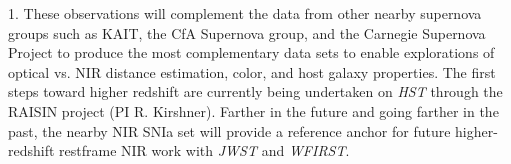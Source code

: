\documentclass[11pt]{article}
\begin{document}
% 



% 
% 
%

\otherfacilities

1. These observations will complement the data from other nearby supernova groups such as KAIT, the CfA Supernova group, and the Carnegie Supernova Project to produce the most complementary data sets to enable explorations of optical vs. NIR distance estimation, color, and host galaxy properties.
The first steps toward higher redshift are currently being undertaken on {\it HST} through the RAISIN project (PI R. Kirshner).
Farther in the future and going farther in the past, the nearby NIR SNIa set will provide a reference anchor for future higher-redshift restframe NIR work with {\it JWST} and {\it WFIRST}. 
\end{document}
